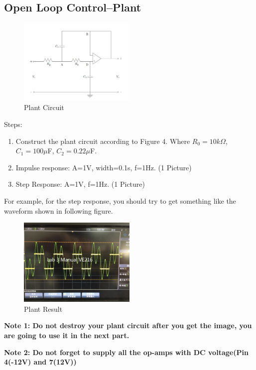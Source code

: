 \documentclass[a4paper]{article}
\begin{document}
\subsection{Open Loop Control--Plant}
\begin{figure}[H]
    \begin{center}
        \includegraphics[width=0.5\textwidth]{4.jpg}
    \end{center}
    \caption{Plant Circuit}
\end{figure}
Steps:
\begin{enumerate}
    \item Construct the plant circuit according to Figure 4. Where $R_0=10k\Omega$, $C_1=100\mu$F, $C_2=0.22\mu$F.
    \item Impulse response: A=1V, width=0.1s, f=1Hz. (1 Picture)
    \item Step Response: A=1V, f=1Hz. (1 Picture)
\end{enumerate}
For example, for the step response, you should try to get something like the waveform shown in following figure.
\begin{figure}[H]
    \begin{center}
        \includegraphics[width=0.5\textwidth]{5.jpg}
    \end{center}
    \caption{Plant Result}
\end{figure}
\textbf{Note 1: Do not destroy your plant circuit after you get the image, you are going to use it in the next part.}

\textbf{Note 2: Do not forget to supply all the op-amps with DC voltage(Pin 4(-12V) and 7(12V))}
\end{document}
